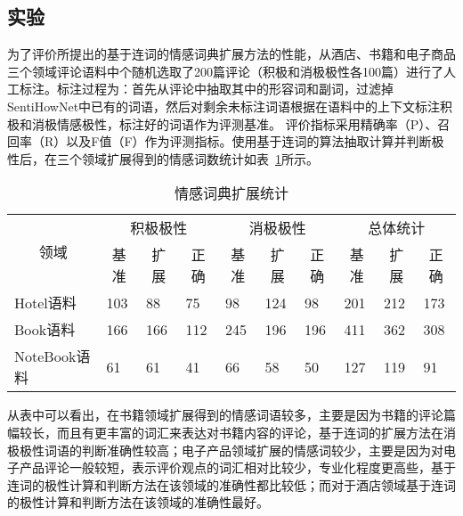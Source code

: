 \subsection{实验}
为了评价所提出的基于连词的情感词典扩展方法的性能，从酒店、书籍和电子商品三个领域评论语料中个随机选取了200篇评论（积极和消极极性各100篇）进行了人工标注。标注过程为：首先从评论中抽取其中的形容词和副词，过滤掉SentiHowNet中已有的词语，然后对剩余未标注词语根据在语料中的上下文标注积极和消极情感极性，标注好的词语作为评测基准。
评价指标采用精确率（P）、召回率（R）以及F值（F）作为评测指标。使用基于连词的算法抽取计算并判断极性后，在三个领域扩展得到的情感词数统计如表~\ref{tab3-2}所示。
\begin{table}[htp]
\centering
\caption{情感词典扩展统计}
\label{tab3-2}
\begin{tabular}{|l|l|l|l|l|l|l|l|l|l|}
\hline
\multicolumn{1}{|c|}{\multirow{2}{*}{领域}} & \multicolumn{3}{c|}{积极极性} & \multicolumn{3}{c|}{消极极性} & \multicolumn{3}{c|}{总体统计} \\ \cline{2-10} 
\multicolumn{1}{|c|}{} & \multicolumn{1}{c|}{基准} & \multicolumn{1}{c|}{扩展} & \multicolumn{1}{c|}{正确} & \multicolumn{1}{c|}{基准} & \multicolumn{1}{c|}{扩展} & \multicolumn{1}{c|}{正确} & \multicolumn{1}{c|}{基准} & \multicolumn{1}{c|}{扩展} & \multicolumn{1}{c|}{正确} \\ \hline
Hotel语料 & 103 & 88 & 75 & 98 & 124 & 98 & 201 & 212 & 173 \\ \hline
Book语料 & 166 & 166 & 112 & 245 & 196 & 196 & 411 & 362 & 308 \\ \hline
NoteBook语料 & 61 & 61 & 41 & 66 & 58 & 50 & 127 & 119 & 91 \\ \hline
\end{tabular}
\end{table}

从表中可以看出，在书籍领域扩展得到的情感词语较多，主要是因为书籍的评论篇幅较长，而且有更丰富的词汇来表达对书籍内容的评论，基于连词的扩展方法在消极极性词语的判断准确性较高；电子产品领域扩展的情感词较少，主要是因为对电子产品评论一般较短，表示评价观点的词汇相对比较少，专业化程度更高些，基于连词的极性计算和判断方法在该领域的准确性都比较低；而对于酒店领域基于连词的极性计算和判断方法在该领域的准确性最好。

